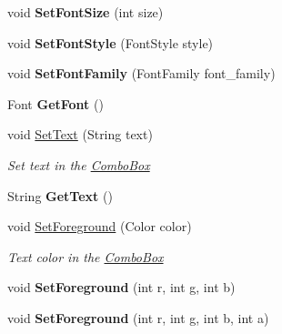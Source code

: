 \begin{DoxyCompactItemize}
\mbox{\label{class_space_v_i_l_1_1_combo_box_a68db1339cb3a886fa4150ea5aa26489b}} 
void {\bfseries Set\+Font\+Size} (int size)
\item 
\mbox{\label{class_space_v_i_l_1_1_combo_box_a58c2fb8ac52e8e3e039cfdbc64d1e150}} 
void {\bfseries Set\+Font\+Style} (Font\+Style style)
\item 
\mbox{\label{class_space_v_i_l_1_1_combo_box_a01f181a536fffe738b34aadaa137a643}} 
void {\bfseries Set\+Font\+Family} (Font\+Family font\+\_\+family)
\item 
\mbox{\label{class_space_v_i_l_1_1_combo_box_a8b5044048a32fb1ed44e86e8a8629121}} 
Font {\bfseries Get\+Font} ()
\item 
void \mbox{\hyperlink{class_space_v_i_l_1_1_combo_box_a9a72026c1c366df889b2f8829e965b98}{Set\+Text}} (String text)
\begin{DoxyCompactList}\small\item\em Set text in the \mbox{\hyperlink{class_space_v_i_l_1_1_combo_box}{Combo\+Box}} \end{DoxyCompactList}\item 
\mbox{\label{class_space_v_i_l_1_1_combo_box_abf4fa44bae22b3e3ab804639faf55238}} 
String {\bfseries Get\+Text} ()
\item 
void \mbox{\hyperlink{class_space_v_i_l_1_1_combo_box_a968e19273a68fd5655ddead9149ad72c}{Set\+Foreground}} (Color color)
\begin{DoxyCompactList}\small\item\em Text color in the \mbox{\hyperlink{class_space_v_i_l_1_1_combo_box}{Combo\+Box}} \end{DoxyCompactList}\item 
\mbox{\label{class_space_v_i_l_1_1_combo_box_adeebc47cbbe63c134bfd54fbc903ceb2}} 
void {\bfseries Set\+Foreground} (int r, int g, int b)
\item 
\mbox{\label{class_space_v_i_l_1_1_combo_box_a72a43e864c3e81d11b800a974fec0b6c}} 
void {\bfseries Set\+Foreground} (int r, int g, int b, int a)

\end{DoxyCompactItemize}
